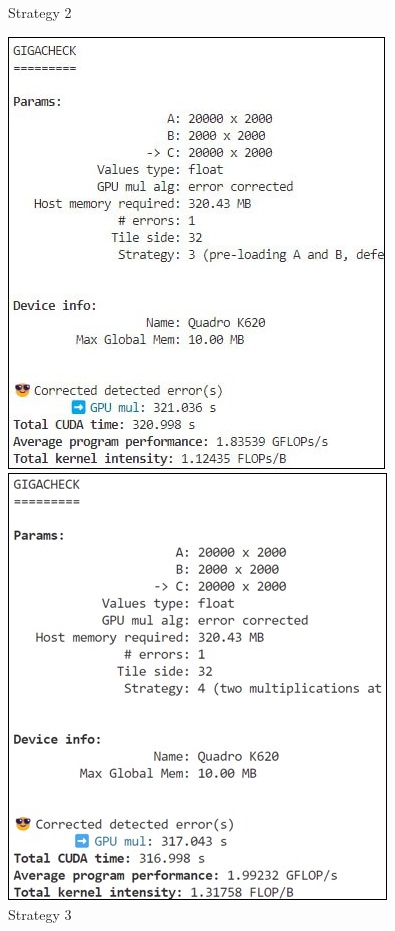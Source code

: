 \begin{figure}[h]
  \caption*{Strategy 2}
  \endminipage\hfill
  \linebreak
  \vspace{.02\textwidth}
  \linebreak
  \includegraphics[width=\textwidth]{images/result_s3}
  \caption*{Strategy 3}
  \endminipage\hfill
  \includegraphics[width=\textwidth]{images/result_s4}

\end{figure}
